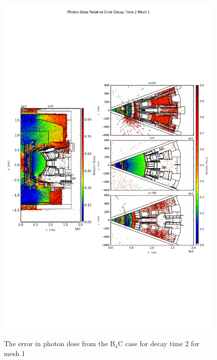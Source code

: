 \begin{figure}[ht!]
\centering
\includegraphics[trim={0cm 9cm 0cm 10cm},clip,scale=0.75]{../plots/final_model_with_b4c/Photon_Dose_Relative_Error_Decay_Time_2_Mesh_1.png}
\label{fig:photons_dc2_no4bc_m1_error}
\caption{The error in photon dose from the B$_4$C case for decay time 2 for mesh 1}
\end{figure}

